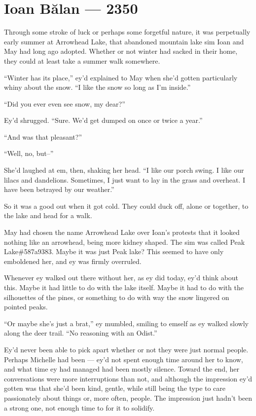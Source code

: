 \hypertarget{ioan-bux103lan-2350}{%
\chapter{Ioan Bălan — 2350}\label{ioan-bux103lan-2350}}

Through some stroke of luck or perhaps some forgetful nature, it was perpetually early summer at Arrowhead Lake, that abandoned mountain lake sim Ioan and May had long ago adopted. Whether or not winter had sacked in their home, they could at least take a summer walk somewhere.

``Winter has its place,'' ey'd explained to May when she'd gotten particularly whiny about the snow. ``I like the snow so long as I'm inside.''

``Did you ever even see snow, my dear?''

Ey'd shrugged. ``Sure. We'd get dumped on once or twice a year.''

``And was that pleasant?''

``Well, no, but--''

She'd laughed at em, then, shaking her head. ``I like our porch swing. I like our lilacs and dandelions. Sometimes, I just want to lay in the grass and overheat. I have been betrayed by our weather.''

So it was a good out when it got cold. They could duck off, alone or together, to the lake and head for a walk.

May had chosen the name Arrowhead Lake over Ioan's protests that it looked nothing like an arrowhead, being more kidney shaped. The sim was called Peak Lake\#587a9383. Maybe it was just Peak lake? This seemed to have only emboldened her, and ey was firmly overruled.

Whenever ey walked out there without her, as ey did today, ey'd think about this. Maybe it had little to do with the lake itself. Maybe it had to do with the silhouettes of the pines, or something to do with way the snow lingered on pointed peaks.

``Or maybe she's just a brat,'' ey mumbled, smiling to emself as ey walked slowly along the deer trail. ``No reasoning with an Odist.''

Ey'd never been able to pick apart whether or not they were just normal people. Perhaps Michelle had been — ey'd not spent enough time around her to know, and what time ey had managed had been mostly silence. Toward the end, her conversations were more interruptions than not, and although the impression ey'd gotten was that she'd been kind, gentle, while still being the type to care passionately about things or, more often, people. The impression just hadn't been a strong one, not enough time to for it to solidify.

